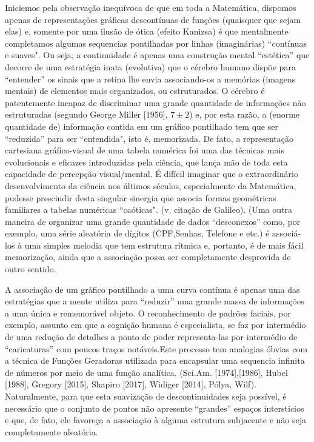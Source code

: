     Iniciemos pela observação inequívoca de que em toda a Matemática, dispomos apenas de representações gráficas descontínuas de funções (quaisquer que sejam elas) e, somente por uma ilusão de ótica (efeito Kanizsa) é que mentalmente completamos algumas sequencias pontilhadas por linhas (imaginárias) ``contínuas e suaves". Ou seja, a continuidade é apenas uma construção mental ``estética'' que decorre de uma estratégia inata (evolutiva) que o cérebro humano dispõe para ``entender'' os sinais que a retina lhe envia associando-os a memórias (imagens mentais) de elementos mais organizados, ou estruturados. O cérebro é patentemente incapaz de discriminar uma grande quantidade de informações não estruturadas (segundo George Miller [1956], \(7 \pm 2\)) e, por esta razão, a (enorme quantidade de) informação contida em um gráfico pontilhado tem que ser ``reduzida'' para ser ``entendida", isto é, memorizada. De fato, a representação cartesiana gráfico-visual de uma tabela numérica foi uma das técnicas mais evolucionais e eficazes introduzidas pela ciência, que lança mão de toda esta capacidade de percepção visual/mental. É difícil imaginar que o extraordinário desenvolvimento da ciência nos últimos séculos, especialmente da Matemática, pudesse prescindir desta singular sinergia que associa formas geométricas familiares a tabelas numéricas ``caóticas". (v. citação de Galileo). (Uma outra maneira de organizar uma grande quantidade de dados ``desconexos'' como, por exemplo, uma série aleatória de dígitos (CPF,Senhas, Telefone e etc.) é associá-los à uma simples melodia que tem estrutura rítmica e, portanto, é de mais fácil memorização, ainda que a associação possa ser completamente desprovida de outro sentido.

    A associação de um gráfico pontilhado a uma curva contínua é apenas uma das estratégias que a mente utiliza para ``reduzir'' uma grande massa de informações a uma única e rememorável objeto. O reconhecimento de padrões faciais, por exemplo, assunto em que a cognição humana é especialista, se faz por intermédio de uma redução de detalhes a ponto de poder representa-las por intermédio de ``caricaturas'' com poucos traços notáveis.Este processo tem analogias óbvias com a técnica de Funções Geradoras utilizada para encapsular uma sequencia infinita de números por meio de uma função analítica. (Sci.Am. [1974],[1986], Hubel [1988], Gregory [2015], Shapiro [2017], Widiger [2014], Pólya, Wilf). Naturalmente, para que esta suavização de descontinuidades seja possível, é necessário que o conjunto de pontos não apresente ``grandes'' espaços interstícios e que, de fato, ele favoreça a associação à alguma estrutura subjacente e não seja completamente aleatória.

